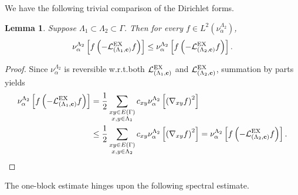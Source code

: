 \documentclass[11pt]{amsart}
\theoremstyle{plain}
\newtheorem{lemma}{Lemma}[section]
\theoremstyle{definition}
\theoremstyle{remark}
\begin{document}
We have the following trivial comparison of the Dirichlet forms.
\begin{lemma}
\label{lem:DFEst1}
Suppose $\Lambda_1 \subset \Lambda_2 \subset \Gamma$. Then for every $f \in L^2(\nu_\alpha^{\Lambda_2})$, 
\begin{align}
\nu_\alpha^{\Lambda_2}\left[ f\left(-\mathcal{L}^{\rm EX}_{(\Lambda_1,{\bf c})}f\right)\right] \leq \nu_\alpha^{\Lambda_2} \left[ f \left( -\mathcal{L}^{\rm EX}_{(\Lambda_2,{\bf c})}f\right)\right].
 \end{align}
\end{lemma}
\begin{proof}
Since $\nu_\alpha^{\Lambda_2}$ is reversible w.r.t.\@ both $\mathcal{L}^{\rm EX}_{(\Lambda_1,{\bf c})}$ and $\mathcal{L}^{\rm EX}_{(\Lambda_2,{\bf c})}$, summation by parts yields
\begin{align*}
\nu_\alpha^{\Lambda_2}\left[ f\left(-\mathcal{L}^{\rm EX}_{(\Lambda_1,{\bf c})}f\right)\right] &= \frac{1}{2} \sum_{\substack{xy\in E(\Gamma)\\ x,y \in \Lambda_1}} c_{xy} \nu_\alpha^{\Lambda_2}\left[\left(\nabla_{xy} f\right)^2\right] \\ & \leq \frac{1}{2} \sum_{\substack{xy\in E(\Gamma)\\ x,y \in \Lambda_2}} c_{xy} \nu_\alpha^{\Lambda_2}\left[\left(\nabla_{xy} f\right)^2\right] 
=\nu_\alpha^{\Lambda_2} \left[ f \left( -\mathcal{L}^{\rm EX}_{(\Lambda_2,{\bf c})}f\right)\right].
\end{align*}
\end{proof} 

The one-block estimate hinges upon the following spectral estimate.
\end{document}

